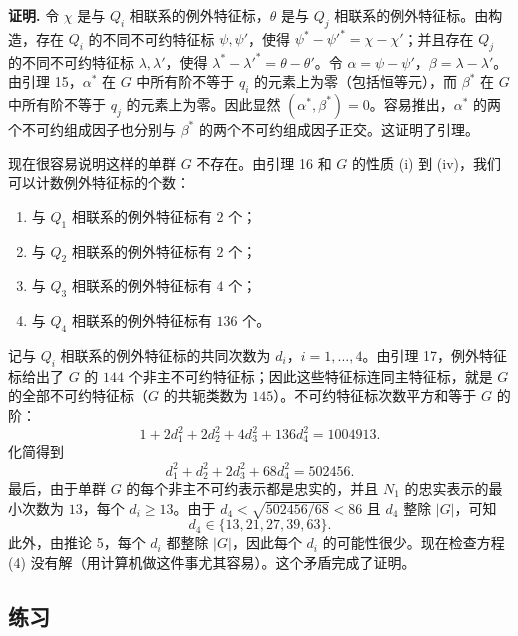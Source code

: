 \noindent\textbf{证明.} 令 $\chi$ 是与 $Q_i$ 相联系的例外特征标，$\theta$ 是与 $Q_j$ 相联系的例外特征标。由构造，存在 $Q_i$ 的不同不可约特征标 $\psi,\psi'$，使得 $\psi^*-\psi'^*=\chi-\chi'$；并且存在 $Q_j$ 的不同不可约特征标 $\lambda,\lambda'$，使得 $\lambda^*-\lambda'^*=\theta-\theta'$。令 $\alpha=\psi-\psi'$，$\beta=\lambda-\lambda'$。由引理 15，$\alpha^*$ 在 $G$ 中所有阶不等于 $q_i$ 的元素上为零（包括恒等元），而 $\beta^*$ 在 $G$ 中所有阶不等于 $q_j$ 的元素上为零。因此显然 $(\alpha^*,\beta^*)=0$。容易推出，$\alpha^*$ 的两个不可约组成因子也分别与 $\beta^*$ 的两个不可约组成因子正交。这证明了引理。

现在很容易说明这样的单群 $G$ 不存在。由引理 16 和 $G$ 的性质 (i) 到 (iv)，我们可以计数例外特征标的个数：
\begin{enumerate}[label=(\roman*)]
  \item 与 $Q_1$ 相联系的例外特征标有 $2$ 个；
  \item 与 $Q_2$ 相联系的例外特征标有 $2$ 个；
  \item 与 $Q_3$ 相联系的例外特征标有 $4$ 个；
  \item 与 $Q_4$ 相联系的例外特征标有 $136$ 个。
\end{enumerate}
记与 $Q_i$ 相联系的例外特征标的共同次数为 $d_i$，$i=1,\ldots,4$。由引理 17，例外特征标给出了 $G$ 的 $144$ 个非主不可约特征标；因此这些特征标连同主特征标，就是 $G$ 的全部不可约特征标（$G$ 的共轭类数为 $145$）。不可约特征标次数平方和等于 $G$ 的阶：
\[
  1+2d_1^2+2d_2^2+4d_3^2+136d_4^2=1004913.
\]
化简得到
\[
  d_1^2+d_2^2+2d_3^2+68d_4^2=502456. \tag{19.4}
\]
最后，由于单群 $G$ 的每个非主不可约表示都是忠实的，并且 $N_1$ 的忠实表示的最小次数为 $13$，每个 $d_i\geq13$。由于 $d_4<\sqrt{502456/68}<86$ 且 $d_4$ 整除 $|G|$，可知
\[
  d_4\in\{13,21,27,39,63\}.
\]
此外，由推论 5，每个 $d_i$ 都整除 $|G|$，因此每个 $d_i$ 的可能性很少。现在检查方程 (4) 没有解（用计算机做这件事尤其容易）。这个矛盾完成了证明。

\subsection*{练习}

